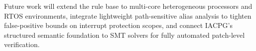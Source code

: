 \documentclass[a4paper,UKenglish,cleveref, autoref, thm-restate]{lipics-v2021}
\begin{document}
Future work will extend the rule base to multi-core heterogeneous processors and RTOS environments, integrate lightweight path-sensitive alias analysis to tighten false-positive bounds on interrupt protection scopes, and connect IACPG's structured semantic foundation to SMT solvers for fully automated patch-level verification.


\end{document}
